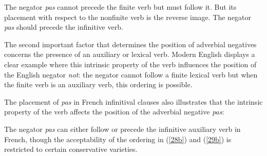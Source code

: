 \documentclass[output=paper
                ,modfonts
		,nonflat
	        ,collection
	        ,collectionchapter
	        ,collectiontoclongg
 	        ,biblatex  
                ,babelshorthands
                ,newtxmath
                ,draftmode
                ,colorlinks, citecolor=brown 
]{./langsci/langscibook}
\begin{document}
{\begin{exe}
\begin{xlist}
\begin{exe}
\begin{xlist}
\eal{}
\zl

\eal{}
\zl

\noindent
The negator \textit{pas} cannot precede the finite verb
but must follow it. But its placement with respect to
the nonfinite verb is the reverse image. The negator \textit{pas}
should precede the infinitive verb.

The second important factor that determines the position of adverbial
negatives concerns the presence of an auxiliary or lexical  verb.
Modern English displays a clear example where this
intrinsic property of the verb influences the position of
the English negator \textit{not}: the negator cannot follow
a finite lexical  verb but when the finite verb is an auxiliary verb,
this ordering is possible.

\eal
{}
\zl

\noindent
The placement of \textit{pas} in French infinitival
clauses also illustrates that the intrinsic property of
the verb affects the position of the adverbial negative \textit{pas}:

\eal
{}
 \label{28b}
\zl

\eal
{}
 \label{29b}
\zl

\noindent
The negator \textit{pas} can either follow or precede the infinitive
auxiliary verb in French, though the acceptability of the
ordering in (\ref{28b}) and (\ref{29b}) is restricted to certain conservative
varieties.


\end{xlist}
\end{exe}
\end{xlist}
\end{exe}}
\end{document}
